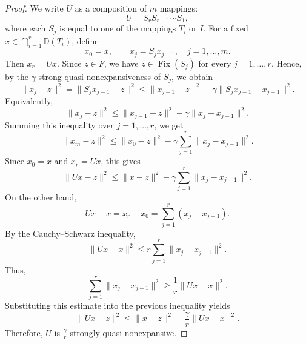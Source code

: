 \documentclass[10pt,a4paper]{amsart}
\begin{document}
\begin{proof}
	We write \(U\) as a composition of \(m\) mappings:
	\[
	U=S_rS_{r-1}\cdots S_1,
	\]
	where each \(S_j\) is equal to one of the mappings \(T_i\) or $I$. For a fixed
	\(x\in \bigcap_{i=1}^r \mathbb{D}(T_i)\), define
	\[
	x_0=x,\qquad x_j=S_jx_{j-1},\quad j=1,\ldots,m.
	\]
	Then \(x_r=Ux\). Since \(z\in F\), we have \(z\in \operatorname{Fix}(S_j)\)
	for every \(j=1,\ldots,r\). Hence, by the \(\gamma\)-strong
	quasi-nonexpansiveness of \(S_j\), we obtain
	\[
	\|x_j-z\|^2
	=
	\|S_jx_{j-1}-z\|^2
	\leq
	\|x_{j-1}-z\|^2
	-
	\gamma\|S_jx_{j-1}-x_{j-1}\|^2 .
	\]
	Equivalently,
	\[
	\|x_j-z\|^2
	\leq
	\|x_{j-1}-z\|^2
	-
	\gamma\|x_j-x_{j-1}\|^2 .
	\]
	Summing this inequality over \(j=1,\ldots,r\), we get
	\[
	\|x_m-z\|^2
	\leq
	\|x_0-z\|^2
	-
	\gamma\sum_{j=1}^r \|x_j-x_{j-1}\|^2 .
	\]
	Since \(x_0=x\) and \(x_r=Ux\), this gives
	\[
	\|Ux-z\|^2
	\leq
	\|x-z\|^2
	-
	\gamma\sum_{j=1}^r \|x_j-x_{j-1}\|^2 .
	\]
	On the other hand,
	\[
	Ux-x=x_r-x_0
	=
	\sum_{j=1}^r (x_j-x_{j-1}).
	\]
	By the Cauchy--Schwarz inequality,
	\[
	\|Ux-x\|^2
	\leq
	r\sum_{j=1}^r \|x_j-x_{j-1}\|^2 .
	\]
	Thus,
	\[
	\sum_{j=1}^r \|x_j-x_{j-1}\|^2
	\geq
	\frac{1}{r}\|Ux-x\|^2 .
	\]
	Substituting this estimate into the previous inequality yields
	\[
	\|Ux-z\|^2
	\leq
	\|x-z\|^2
	-
	\frac{\gamma}{r}\|Ux-x\|^2 .
	\]
	Therefore, \(U\) is \(\frac{\gamma}{r}\)-strongly quasi-nonexpansive.
\end{proof}
\end{document}
